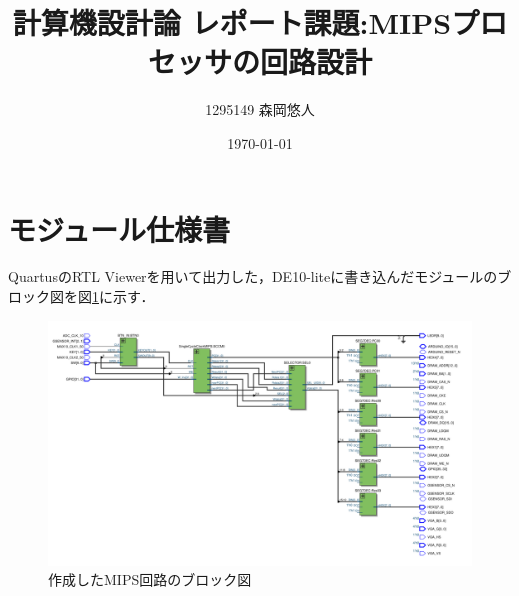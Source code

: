 \documentclass[dvipdfmx]{jsarticle}
\title{計算機設計論 レポート課題:MIPSプロセッサの回路設計}
\author{1295149 森岡悠人\\}
\date{\today}
\begin{document}
\maketitle

\section{モジュール仕様書}


QuartusのRTL Viewerを用いて出力した，DE10-liteに書き込んだモジュールのブロック図を図\ref{fig:rtl}に示す．
\begin{figure}[h]
\centering
  \includegraphics[width=\textwidth]{myRTL.png}
  \caption{作成したMIPS回路のブロック図}
  \label{fig:rtl}
\end{figure}
\end{document}
